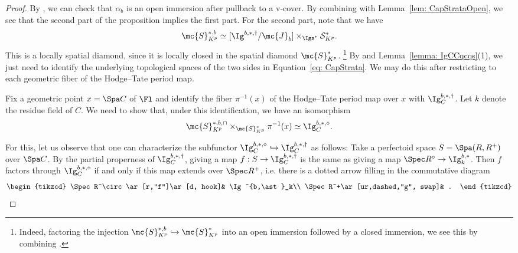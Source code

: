 \documentclass[letterpaper,11pt]{amsart}
\begin{document}
\begin{proof}
     By \cite[Proposition 10.11]{Ecod}, we can check that $\alpha_b$ is an open immersion after pullback to a v-cover. By combining with Lemma~\ref{lem: CapStrataOpen}, we see that the second part of the proposition implies the first part. For the second part, note that we have 
     \[\mc{S}_{K^p}^{\ast,b}\simeq [\Ig^{b,\ast,\dagger}/\mc{J}_b]\times_{\Igs^\ast}\mathcal{S}^*_{K^p}.\]
     This is a locally spatial diamond, since it is locally closed in the spatial diamond $\mc{S}_{K^p}^\ast$. \footnote{Indeed, factoring the injection $\mc{S}_{K^p}^{\ast,b}\hookrightarrow \mc{S}_{K^p}^{\ast}$ into an open immersion followed by a closed immersion, we see this by combining \cite[Corollary 11.26, Proposition 11.19]{Ecod}.} By \cite[Proposition 11.20]{Ecod} and Lemma~\ref{lemma: IgCCqcqs}(1), we just need to identify the underlying topological spaces of the two sides in Equation~\eqref{eq: CapStrata}. We may do this after restricting to each geometric fiber of the Hodge--Tate period map. 
     
     Fix a geometric point $x=\Spa C$ of $\Fl$ and identify the fiber $\pi^{-1}(x)$ of the Hodge--Tate period map over $x$ with $\Ig^{b,\ast,\dagger}_C$. Let $k$ denote the residue field of $C$. We need to show that, under this identification, we have an isomorphism
     \begin{equation}\label{eq: CapFibers}
         \mc{S}_{K^p}^{\ast,b,\cap}\times_{\mc{S}_{K^p}^\ast} \pi^{-1}(x)\simeq \Ig^{b,\ast,\diamond}_C.
     \end{equation}

     For this, let us observe that one can characterize the subfunctor $\Ig^{b,\ast,\diamond}_C\hookrightarrow \Ig^{b,\ast,\dagger}_C$ as follows: Take a perfectoid space $S=\Spa(R,R^+)$ over $\Spa C$. By the partial properness of $\Ig^{b,\ast,\dagger}_C$, giving a map $f:S\to \Ig^{b,\ast,\dagger}_C$ is the same as giving a map $\Spec R^\circ \to \Ig^{b,\ast}_k$. Then $f$ factors through $\Ig^{b,\ast,\diamond}_C$ if and only if this map extends over $\Spec R^+$, i.e. there is a dotted arrow filling in the commutative diagram 
     \[\begin{tikzcd}
         \Spec R^\circ\ar[r,"f"]\ar[d, hook]& \Ig^{b,\ast}_k\\
         \Spec R^+\ar[ur,dashed,"g", swap]& .
     \end{tikzcd}\]


\end{proof}
\end{document}
